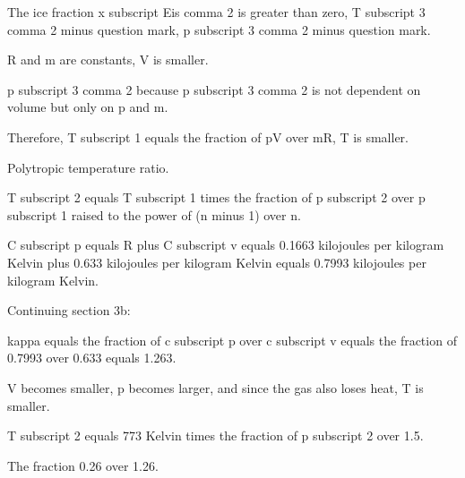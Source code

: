 The ice fraction x subscript Eis comma 2 is greater than zero, T subscript 3 comma 2 minus question mark, p subscript 3 comma 2 minus question mark.

R and m are constants, V is smaller.

p subscript 3 comma 2 because p subscript 3 comma 2 is not dependent on volume but only on p and m.

Therefore, T subscript 1 equals the fraction of pV over mR, T is smaller.

Polytropic temperature ratio.

T subscript 2 equals T subscript 1 times the fraction of p subscript 2 over p subscript 1 raised to the power of (n minus 1) over n.

C subscript p equals R plus C subscript v equals 0.1663 kilojoules per kilogram Kelvin plus 0.633 kilojoules per kilogram Kelvin equals 0.7993 kilojoules per kilogram Kelvin.

Continuing section 3b:

kappa equals the fraction of c subscript p over c subscript v equals the fraction of 0.7993 over 0.633 equals 1.263.

V becomes smaller, p becomes larger, and since the gas also loses heat, T is smaller.

T subscript 2 equals 773 Kelvin times the fraction of p subscript 2 over 1.5.

The fraction 0.26 over 1.26.